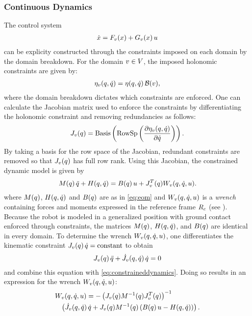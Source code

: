 \subsubsection{Continuous Dynamics}

The control system
\begin{align*}
  {\dot {x}} = F_{v}(x) + G_{v}(x) \, u
\end{align*}
can be explicity constructed through the constraints imposed on each domain by
the domain breakdown.
%
For the domain $v \in V$, the imposed holonomic constraints are given by:
%
\begin{align*}
  \eta_{v}(q, \dot{q}) = \eta(q, \dot{q}) \, \mathcal{B}(v),
\end{align*}
%
where the domain breakdown dictates which constraints are enforced.
%
One can calculate the Jacobian matrix used to enforce the constraints by differentiating the holonomic constraint and removing redundancies as follows:
%
\begin{align*}
  J_{v}(q) = \mathrm{Basis}\left( \mathrm{RowSp}\left( \frac{\partial{\eta_{v}(q, \dot{q})}}{\partial{{\dot{q}}}} \right) \right).
\end{align*}
%
By taking a basis for the row space of the Jacobian, redundant constraints are removed so that $J_v(q)$ has full row rank.
%
Using this Jacobian, the constrained dynamic model is given by
%
\begin{align}
  \label{eq:constraineddynamics}
  M(q) \, \ddot{q} + H(q, \dot{q}) = B(q) \, u + J_v^T(q) W_{v}(q, \dot{q}, u).
\end{align}
%
where $M(q)$, $H(q, \dot{q})$ and $B(q)$ are as in \eqref{eq:eom} and $W_{v}(q, \dot{q}, u)$ is a {\em wrench} containing forces and moments expressed in the reference frame $R_{c}$ (see \cite{Murray1994}).
%
Because the robot is modeled in a generalized position with ground contact enforced through constraints, the matrices $M(q)$, $H(q, \dot{q})$, and $B(q)$ are identical in every domain.
%
To determine the wrench $W_{v}(q, \dot{q}, u)$, one differentiates the kinematic constraint $J_v(q) \, \dot{q} = \mathrm{constant}$ to obtain
%
\begin{align*}
  J_{v}(q) \, \ddot{q} + {\dot J}_{v}(q, \dot{q}) \, \dot{q} = 0
\end{align*}
%
and combine this equation with \eqref{eq:constraineddynamics}.
%
Doing so results in an expression for the wrench $W_{v}(q, \dot{q}, u)$:
%
\begin{align}
  \label{eq:wrench}
  \lefteqn{\Fv\argsqdqu = -\left( J_{v}\argsq \M^{-1}\argsq J_{v}^{T}\argsq \right)^{-1} }\\
  \nonumber
  &&\left( {\dot J}_{v}\argsqdq \, \dq + J_{v}\argsq \M^{-1}\argsq \left( \B\argsq \, \uu - \HCor\argsqdq \right) \right).
\end{align}

